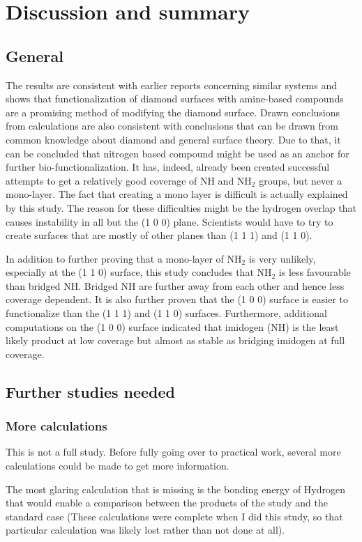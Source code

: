 \documentclass[12pt,a4paper]{article}
\begin{document}
\section{Discussion and summary}
\subsection{General}
The results are consistent with earlier reports concerning similar systems and shows that functionalization of diamond surfaces with amine-based compounds are a promising method of modifying the diamond surface. Drawn conclusions from calculations are also consistent with conclusions that can be drawn from common knowledge about diamond and general surface theory. Due to that, it can be concluded that nitrogen based compound might be used as an anchor for further bio-functionalization. It has, indeed, already been created successful attempts to get a relatively good coverage of NH and NH$_2$ groups, but never a mono-layer. The fact that creating a mono layer is difficult is actually explained by this study. The reason for these difficulties might be the hydrogen overlap that causes instability in all but the (1 0 0) plane. Scientists would have to try to create surfaces that are mostly of other planes than (1 1 1) and (1 1 0). 

In addition to further proving that a mono-layer of NH$_2$ is very unlikely, especially at the (1 1 0) surface, this study concludes that NH$_2$ is less favourable than bridged NH. Bridged NH are further away from each other and hence less coverage dependent. It is also further proven that the (1 0 0) surface is easier to functionalize than the (1 1 1) and (1 1 0) surfaces. Furthermore, additional computations on the (1 0 0) surface indicated that imidogen (NH) is the least likely product at low coverage but almost as stable as bridging imidogen at full coverage. 

\subsection{Further studies needed}
\subsubsection{More calculations}
This is not a full study. Before fully going over to practical work, several more calculations could be made to get more information. 

The most glaring calculation that is missing is the bonding energy of Hydrogen that would enable a comparison between the products of the study and the standard case (These calculations were complete when I did this study, so that particular calculation was likely lost rather than not done at all). 
\end{document}
